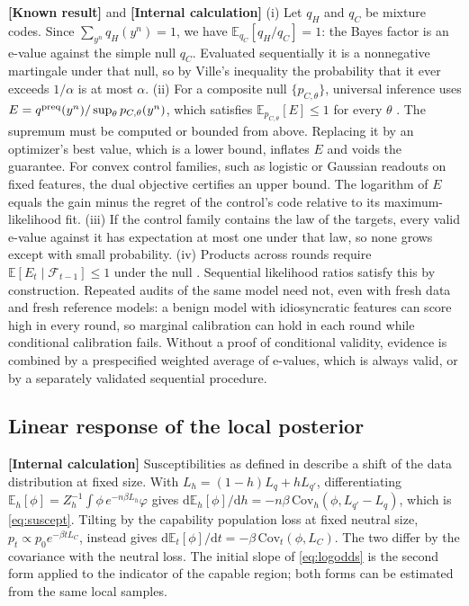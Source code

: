 \documentclass[11pt,a4paper]{article}
\newcommand{\E}{\mathbb E}
\newcommand{\dd}{\mathrm d}
\newcommand{\evl}[2]{{\small\bfseries\color{#1}[#2]}}
\newcommand{\LKnown}{\evl{cknown}{Known result}}
\newcommand{\LCalc}{\evl{ccalc}{Internal calculation}}
\begin{document}
\LKnown{} and \LCalc{} (i) Let $q_H$ and $q_C$ be mixture codes. Since
$\sum_{y^n}q_H(y^n)=1$, we have $\E_{q_C}[q_H/q_C]=1$: the Bayes factor is an
e-value against the simple null $q_C$. Evaluated sequentially it is a
nonnegative martingale under that null, so by Ville's inequality the
probability that it ever exceeds $1/\alpha$ is at most $\alpha$.
(ii) For a composite null $\{p_{C,\theta}\}$, universal inference uses
$E=q^{\rm preq}(y^n)/\sup_\theta p_{C,\theta}(y^n)$, which satisfies
$\E_{p_{C,\theta}}[E]\le1$ for every $\theta$ \cite{wasserman2020}. The
supremum must be computed or bounded from above. Replacing it by an
optimizer's best value, which is a lower bound, inflates $E$ and voids the
guarantee. For convex control families, such as logistic or Gaussian
readouts on fixed features, the dual objective certifies an upper bound.
The logarithm of $E$ equals the gain minus the regret of the control's
code relative to its maximum-likelihood fit. (iii) If the control family
contains the law of the targets, every valid e-value against it has
expectation at most one under that law, so none grows except with small
probability. (iv) Products across rounds require $\E[E_t\mid\mathcal F_{t-1}]\le1$ under the null \cite{grunwald2024safe}. Sequential likelihood ratios satisfy this by construction. Repeated audits of the same model need not, even with fresh data and fresh reference models: a benign model with idiosyncratic features can score high in every round, so marginal calibration can hold in each round while conditional calibration fails. Without a proof of conditional validity, evidence is combined by a prespecified weighted average of e-values, which is always valid, or by a separately validated sequential procedure.

\subsection{Linear response of the local posterior}
\label{app:lr}

\LCalc{} Susceptibilities as defined in \cite{baker2026} describe a shift of
the data distribution at fixed size. With $L_h=(1-h)L_q+hL_{q'}$,
differentiating $\E_h[\phi]=Z_h^{-1}\int\phi\,e^{-n\beta L_h}\varphi$ gives
$\dd\E_h[\phi]/\dd h=-n\beta\,\mathrm{Cov}_h(\phi,L_{q'}-L_q)$, which is
\eqref{eq:suscept}. Tilting by the capability population loss at fixed neutral size, $p_t\propto p_0e^{-\beta tL_C}$, instead gives $\dd\E_t[\phi]/\dd t=-\beta\,\mathrm{Cov}_t(\phi,L_C)$.
The two differ by the covariance with the neutral loss. The initial slope
of \eqref{eq:logodds} is the second form applied to the indicator of the
capable region; both forms can be estimated from the same local samples.
\end{document}
